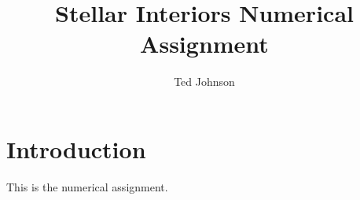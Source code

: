 \documentclass[twocolumn]{aastex631}
\begin{document}
\title{Stellar Interiors Numerical Assignment}

\author{Ted Johnson}


\section{Introduction}
\label{sec:intro}

This is the numerical assignment.




\end{document}
